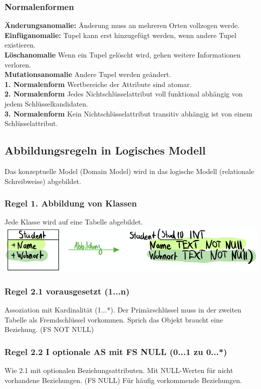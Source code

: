 \documentclass[7pt,landscape,a4paper]{scrartcl}
\begin{document}
\begin{multicols*}{4}
\subsubsection{Normalenformen}
\textbf{Änderungsanomalie:} Änderung muss an mehreren Orten vollzogen werde. \\
\textbf{Einfüganomalie:} Tupel kann erst hinzugefügt werden, wenn andere Tupel existieren. \\
\textbf{Löschanomalie} Wenn ein Tupel gelöscht wird, gehen weitere Informationen verloren. \\
\textbf{Mutationsanomalie} Andere Tupel werden geändert.\\
\textbf{1. Normalenform} Wertbereiche der Attribute sind atomar.\\
\textbf{2. Normalenform} Jedes Nichtschlüsselattribut voll funktional abhängig von jedem Schlüsselkandidaten.\\
\textbf{3. Normalenform} Kein Nichtschlüsselattribut transitiv abhängig ist von einem Schlüsselattribut.
\subsection{Abbildungsregeln in Logisches Modell}
Das konzeptuelle Model (Domain Model) wird in das logische Modell (relationale Schreibweise) abgebildet.
\subsubsection{Regel 1. Abbildung von Klassen}
Jede Klasse wird auf eine Tabelle abgebildet.
\includegraphics[width=0.85\linewidth]{regel1}
\subsubsection{Regel 2.1 vorausgesetzt (1...n)}
Assoziation mit Kardinalität (1...*). Der Primärschlüssel muss in der zweiten Tabelle als Fremdschlüssel vorkommen. Sprich das Objekt braucht eine Beziehung. (FS NOT NULL)
\subsubsection{Regel 2.2 I optionale AS mit FS NULL (0...1 zu 0...*)}
Wie 2.1 mit optionalen Beziehungsattributen. Mit NULL-Werten für nicht vorhandene Beziehungen. (FS NULL) Für häufig vorkommende Beziehungen.

\end{multicols*}
\end{document}
